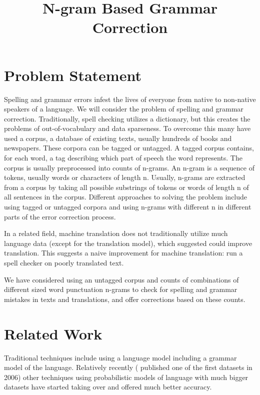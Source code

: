 \documentclass[twocolumn]{article}
\title{N-gram Based Grammar Correction}
\date{}
\begin{document}
%
%


\maketitle
\section{Problem Statement}
Spelling and grammar errors infest the lives of everyone from native to
non-native speakers of a language. We will consider the problem of spelling and
grammar correction. Traditionally, spell checking utilizes a dictionary, but
this creates the problems of out-of-vocabulary and data sparseness. To overcome
this many have used a corpus, a database of existing texts, usually hundreds of
books and newspapers. These corpora can be tagged or untagged. A tagged corpus
contains, for each word, a tag describing which part of speech the word
represents. The corpus is usually preprocessed into counts of n-grams. An n-gram
is a sequence of tokens, usually words or characters of length n. Usually,
n-grams are extracted from a corpus by taking all possible substrings of tokens
or words of length n of all sentences in the corpus. Different approaches to
solving the problem include using tagged or untagged corpora and using n-grams
with different n in different parts of the error correction process.

In a related field, machine translation does not traditionally utilize much
language data (except for the translation model), which \cite{norvig09}
suggested could improve translation. This suggests a naive improvement for
machine translation: run a spell checker on poorly translated text.

We have considered using an untagged corpus and counts of combinations of
different sized word punctuation n-grams to check for spelling and grammar
mistakes in texts and translations, and offer corrections based on these counts.

\section{Related Work}
Traditional techniques include using a language model including a grammar model
of the language. Relatively recently (\cite{michel11} published one of the first
datasets in 2006) other techniques using probabilistic models of language with
much bigger datasets have started taking over and offered much better accuracy.
\end{document}
